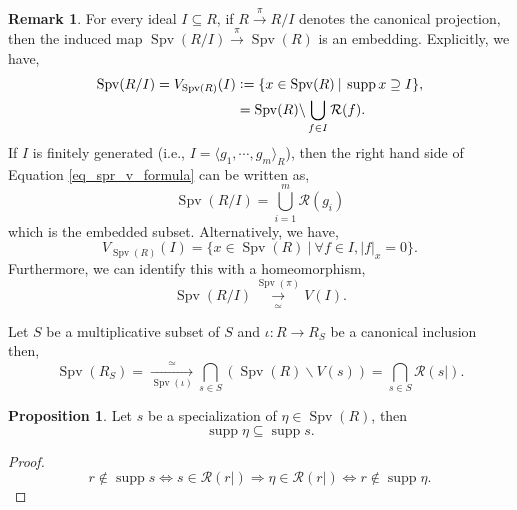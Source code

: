 \documentclass[10pt]{article}
\numberwithin{equation}{section}
\theoremstyle{definition}
\newtheorem{proposition}{Proposition}[subsection]
\newtheorem{remark}{Remark}[subsection]
\DeclareMathOperator{\supp}{supp}
\DeclareMathOperator{\Spv}{Spv}
\newcommand{\defeq}{\vcentcolon=}
\newcommand{\cR}[0]{\mathcal{R}}
\newcommand{\sep}[0]{\:|\:}
\newcommand{\ab}[1]{\vert #1 \vert}
\begin{document}
\begin{remark}
    \label{fact_6_3}
    For every ideal $I\subseteq R$, if $R\stackrel{\pi}{\to}R/I$ denotes the canonical projection, then the induced map $\Spv(R/I)\stackrel{\pi}{\to} \Spv(R)$ is an embedding. Explicitly, we have,
    \begin{align}
        \Spv(R/I) = V_{\Spv(R)}(I) &\defeq\{x\in\Spv(R)\sep \supp x\supseteq I\},\\
        & = \Spv(R)\backslash\bigcup_{f\in I}\cR(f).\label{eq_spr_v_formula}
    \end{align}
    If $I$ is finitely generated (i.e., $I = \langle g_1,\cdots,g_m\rangle_R$), then the right hand side of Equation \eqref{eq_spr_v_formula} can be written as,
    \begin{equation*}
        \Spv(R/I) = \bigcup_{i=1}^m \cR(g_i)
    \end{equation*}
    which is the embedded subset. Alternatively, we have,
    \begin{equation*}
        V_{\Spv(R)}(I) = \{x\in\Spv(R)\sep \forall f\in I, \ab{f}_x = 0\}.
    \end{equation*}
    Furthermore, we can identify this with a homeomorphism,
    \begin{equation*}
        \Spv(R/I)\underset{\simeq}{\stackrel{\Spv(\pi)}{\to}} V(I).
    \end{equation*}
    \par Let $S$ be a multiplicative subset of $S$ and $\iota:R\to R_S$ be a canonical inclusion then,
    \begin{equation*}
        \Spv(R_S) = \underset{\Spv(\iota)}{\stackrel{\simeq}{\to}}\bigcap_{s\in S}(\Spv(R)\backslash V(s)) = \bigcap_{s\in S}\cR(s|).
    \end{equation*}
\end{remark}

\begin{proposition}
    \label{fact_6_4}
    Let $s$ be a specialization of $\eta\in\Spv(R)$, then
    \begin{equation*}
        \supp\eta\subseteq \supp s.
    \end{equation*}
\end{proposition}
\begin{proof}
    \begin{equation*}
        r\not\in\supp s\iff s\in\cR(r|)\Rightarrow \eta\in\cR(r|)\iff r\not\in\supp\eta.
    \end{equation*}
\end{proof}
\end{document}
